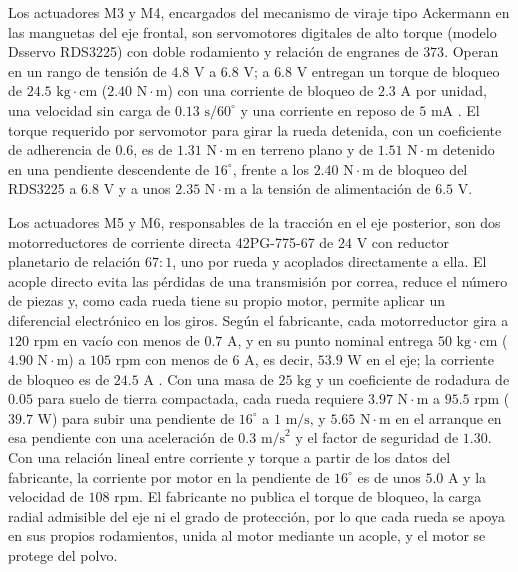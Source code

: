 \documentclass[../../General.tex]{subfiles}
\begin{document}
Los actuadores M3 y M4, encargados del mecanismo de viraje tipo Ackermann en las manguetas del eje frontal, son servomotores digitales de alto torque (modelo Dsservo RDS3225) con doble rodamiento y relación de engranes de $373$. Operan en un rango de tensión de $4.8\text{ V}$ a $6.8\text{ V}$; a $6.8\text{ V}$ entregan un torque de bloqueo de $24.5\text{ kg}\cdot\text{cm}$ ($2.40\text{ N}\cdot\text{m}$) con una corriente de bloqueo de $2.3\text{ A}$ por unidad, una velocidad sin carga de $0.13\text{ s}/60^\circ$ y una corriente en reposo de $5\text{ mA}$ \citep{dsservo_rds3225}. El torque requerido por servomotor para girar la rueda detenida, con un coeficiente de adherencia de $0.6$, es de $1.31\text{ N}\cdot\text{m}$ en terreno plano y de $1.51\text{ N}\cdot\text{m}$ detenido en una pendiente descendente de $16^\circ$, frente a los $2.40\text{ N}\cdot\text{m}$ de bloqueo del RDS3225 a $6.8\text{ V}$ y a unos $2.35\text{ N}\cdot\text{m}$ a la tensión de alimentación de $6.5\text{ V}$.

Los actuadores M5 y M6, responsables de la tracción en el eje posterior, son dos motorreductores de corriente directa 42PG-775-67 de $24\text{ V}$ con reductor planetario de relación $67:1$, uno por rueda y acoplados directamente a ella. El acople directo evita las pérdidas de una transmisión por correa, reduce el número de piezas y, como cada rueda tiene su propio motor, permite aplicar un diferencial electrónico en los giros. Según el fabricante, cada motorreductor gira a $120\text{ rpm}$ en vacío con menos de $0.7\text{ A}$, y en su punto nominal entrega $50\text{ kg}\cdot\text{cm}$ ($4.90\text{ N}\cdot\text{m}$) a $105\text{ rpm}$ con menos de $6\text{ A}$, es decir, $53.9\text{ W}$ en el eje; la corriente de bloqueo es de $24.5\text{ A}$ \citep{motor_42pg775}. Con una masa de $25\text{ kg}$ y un coeficiente de rodadura de $0.05$ para suelo de tierra compactada, cada rueda requiere $3.97\text{ N}\cdot\text{m}$ a $95.5\text{ rpm}$ ($39.7\text{ W}$) para subir una pendiente de $16^\circ$ a $1\text{ m/s}$, y $5.65\text{ N}\cdot\text{m}$ en el arranque en esa pendiente con una aceleración de $0.3\text{ m/s}^2$ y el factor de seguridad de $1.30$. Con una relación lineal entre corriente y torque a partir de los datos del fabricante, la corriente por motor en la pendiente de $16^\circ$ es de unos $5.0\text{ A}$ y la velocidad de $108\text{ rpm}$. El fabricante no publica el torque de bloqueo, la carga radial admisible del eje ni el grado de protección, por lo que cada rueda se apoya en sus propios rodamientos, unida al motor mediante un acople, y el motor se protege del polvo.
\end{document}
